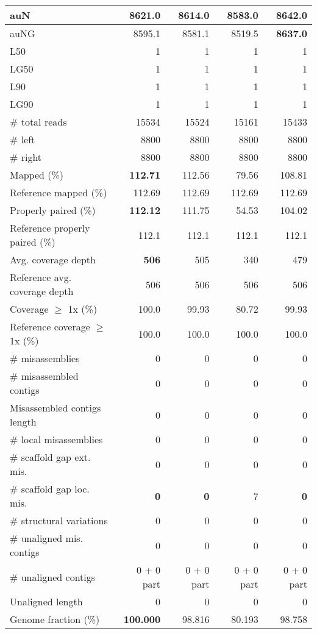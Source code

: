 \documentclass[12pt,a4paper]{article}
\begin{document}
\begin{table}[ht]
\begin{center}
\begin{tabular}{|l*{4}{|r}|}
auN & 8621.0 & 8614.0 & 8583.0 & {\bf 8642.0} \\ \hline
auNG & 8595.1 & 8581.1 & 8519.5 & {\bf 8637.0} \\ \hline
L50 & 1 & 1 & 1 & 1 \\ \hline
LG50 & 1 & 1 & 1 & 1 \\ \hline
L90 & 1 & 1 & 1 & 1 \\ \hline
LG90 & 1 & 1 & 1 & 1 \\ \hline
\# total reads & 15534 & 15524 & 15161 & 15433 \\ \hline
\# left & 8800 & 8800 & 8800 & 8800 \\ \hline
\# right & 8800 & 8800 & 8800 & 8800 \\ \hline
Mapped (\%) & {\bf 112.71} & 112.56 & 79.56 & 108.81 \\ \hline
Reference mapped (\%) & 112.69 & 112.69 & 112.69 & 112.69 \\ \hline
Properly paired (\%) & {\bf 112.12} & 111.75 & 54.53 & 104.02 \\ \hline
Reference properly paired (\%) & 112.1 & 112.1 & 112.1 & 112.1 \\ \hline
Avg. coverage depth & {\bf 506} & 505 & 340 & 479 \\ \hline
Reference avg. coverage depth & 506 & 506 & 506 & 506 \\ \hline
Coverage $\geq$ 1x (\%) & 100.0 & 99.93 & 80.72 & 99.93 \\ \hline
Reference coverage $\geq$ 1x (\%) & 100.0 & 100.0 & 100.0 & 100.0 \\ \hline
\# misassemblies & 0 & 0 & 0 & 0 \\ \hline
\# misassembled contigs & 0 & 0 & 0 & 0 \\ \hline
Misassembled contigs length & 0 & 0 & 0 & 0 \\ \hline
\# local misassemblies & 0 & 0 & 0 & 0 \\ \hline
\# scaffold gap ext. mis. & 0 & 0 & 0 & 0 \\ \hline
\# scaffold gap loc. mis. & {\bf 0} & {\bf 0} & 7 & {\bf 0} \\ \hline
\# structural variations & 0 & 0 & 0 & 0 \\ \hline
\# unaligned mis. contigs & 0 & 0 & 0 & 0 \\ \hline
\# unaligned contigs & 0 + 0 part & 0 + 0 part & 0 + 0 part & 0 + 0 part \\ \hline
Unaligned length & 0 & 0 & 0 & 0 \\ \hline
Genome fraction (\%) & {\bf 100.000} & 98.816 & 80.193 & 98.758 \\ \hline

\end{tabular}
\end{center}
\end{table}
\end{document}
